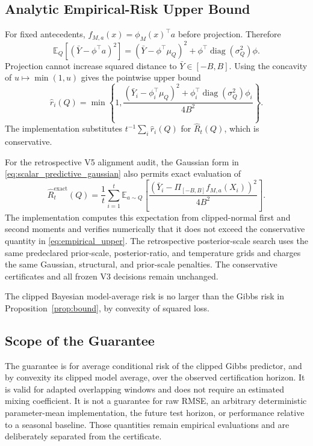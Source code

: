 \subsection{Analytic Empirical-Risk Upper Bound}
For fixed antecedents, $f_{M,a}(x)=\phi_M(x)^\top a$ before projection. Therefore
\begin{equation}
\mathbb E_Q[(\bar Y-\phi^\top a)^2]=(\bar Y-\phi^\top\mu_Q)^2+
\phi^\top\operatorname{diag}(\sigma_Q^2)\phi.
\label{eq:secondmoment}
\end{equation}
Projection cannot increase squared distance to $\bar Y\in[-B,B]$. Using the concavity of $u\mapsto\min(1,u)$ gives the pointwise upper bound
\begin{equation}
\widehat r_i(Q)=\min\left\{1,
\frac{(\bar Y_i-\phi_i^\top\mu_Q)^2+
\phi_i^\top\operatorname{diag}(\sigma_Q^2)\phi_i}{4B^2}
\right\}.
\label{eq:empirical_upper}
\end{equation}
The implementation substitutes $t^{-1}\sum_i\widehat r_i(Q)$ for $\widehat R_t(Q)$, which is conservative.

For the retrospective V5 alignment audit, the Gaussian form in
\eqref{eq:scalar_predictive_gaussian} also permits exact evaluation of
\begin{equation}
 \widehat R_t^{\mathrm{exact}}(Q)=
 \frac{1}{t}\sum_{i=1}^{t}
 \mathbb E_{a\sim Q}\!\left[
 \frac{\left(
 \bar Y_i-\Pi_{[-B,B]}f_{M,a}(X_i)
 \right)^2}{4B^2}\right].
\label{eq:exact_clipped_empirical_risk}
\end{equation}
The implementation computes this expectation from clipped-normal first and
second moments and verifies numerically that it does not exceed the
conservative quantity in \eqref{eq:empirical_upper}. The retrospective
posterior-scale search uses the same predeclared prior-scale,
posterior-ratio, and temperature grids and charges the same Gaussian,
structural, and prior-scale penalties. The conservative certificates and
all frozen V3 decisions remain unchanged.

\begin{corollary}\label{cor:bma}
The clipped Bayesian model-average risk is no larger than the Gibbs risk in Proposition~\ref{prop:bound}, by convexity of squared loss.
\end{corollary}

\subsection{Scope of the Guarantee}
The guarantee is for average conditional risk of the clipped Gibbs predictor, and by convexity its clipped model average, over the observed certification horizon. It is valid for adapted overlapping windows and does not require an estimated mixing coefficient. It is not a guarantee for raw RMSE, an arbitrary deterministic parameter-mean implementation, the future test horizon, or performance relative to a seasonal baseline. Those quantities remain empirical evaluations and are deliberately separated from the certificate.
